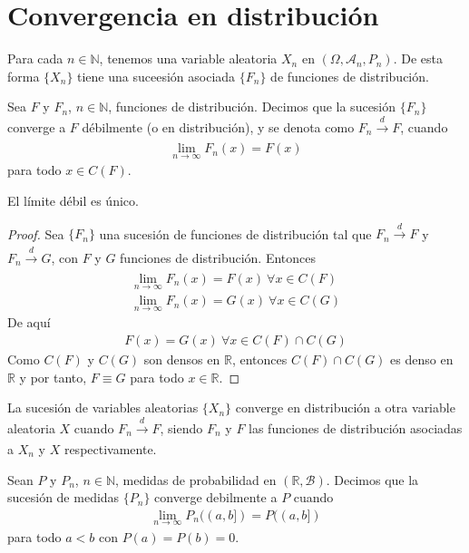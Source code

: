 \section{Convergencia en distribución}

\noindent Para cada $n \in \mathbb{N}$, tenemos una variable aleatoria $X_n$ en $(\Omega, \mathcal{A}_n, P_n)$. De esta forma $\{X_n\}$ tiene una suceesión asociada $\{F_n\}$ de funciones de distribución.
\begin{defi}
    Sea $F$ y $F_n$, $n \in \mathbb{N}$, funciones de distribución. Decimos que la sucesión $\{F_n\}$ converge a $F$ débilmente (o en distribución), y se denota como $F_n \xrightarrow[]{d} F$, cuando
    \begin{align*}
        \lim_{n \to \infty} F_n(x) = F(x)
    \end{align*}
    para todo $x \in C(F)$.
\end{defi}

\begin{teo}
    El límite débil es único.
\end{teo}

\begin{proof}
    Sea $\{F_n\}$ una sucesión de funciones de distribución tal que $F_n \xrightarrow[]{d} F$ y $F_n \xrightarrow[]{d} G$, con $F$ y $G$ funciones de distribución. Entonces
    \begin{align*}
        \lim_{n \to \infty} F_n(x) = F(x) \ \forall x \in C(F) \\
        \lim_{n \to \infty} F_n(x) = G(x) \ \forall x \in C(G)
    \end{align*}
    De aquí
    \begin{align*}
        F(x) = G(x) \ \forall x \in C(F) \cap C(G)
    \end{align*}
    Como $C(F)$ y $C(G)$ son densos en $\mathbb{R}$, entonces $C(F) \cap C(G)$ es denso en $\mathbb{R}$ y por tanto, $F \equiv G$ para todo $x \in \mathbb{R}$.
\end{proof}

\begin{defi}
    La sucesión de variables aleatorias $\{X_n\}$ converge en distribución a otra variable aleatoria $X$ cuando $F_n \xrightarrow[]{d} F$, siendo $F_n$ y $F$ las funciones de distribución asociadas a $X_n$ y $X$ respectivamente.
\end{defi}

\begin{defi}
    Sean $P$ y $P_n$, $n \in \mathbb{N}$, medidas de probabilidad en $(\mathbb{R}, \mathcal{B})$. Decimos que la sucesión de medidas $\{P_n\}$ converge debilmente a $P$ cuando
    \begin{align*}
        \lim_{n \to \infty} P_n((a,b]) = P((a,b])
    \end{align*}
    para todo $a < b$ con $P(a) = P(b) = 0$.
\end{defi}

